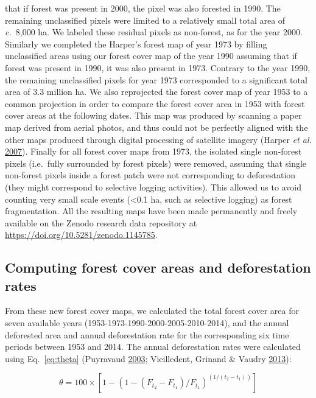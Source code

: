 \documentclass[]{article}
\theoremstyle{definition}
\theoremstyle{definition}
\theoremstyle{definition}
\theoremstyle{remark}
\begin{document}
that if forest was present in 2000, the pixel was also forested in 1990.
The remaining unclassified pixels were limited to a relatively small
total area of \emph{c.}~8,000 ha. We labeled these residual pixels as
non-forest, as for the year 2000. Similarly we completed the Harper's
forest map of year 1973 by filling unclassified areas using our forest
cover map of the year 1990 assuming that if forest was present in 1990,
it was also present in 1973. Contrary to the year 1990, the remaining
unclassified pixels for year 1973 corresponded to a significant total
area of 3.3 million ha. We also reprojected the forest cover map of year
1953 to a common projection in order to compare the forest cover area in
1953 with forest cover areas at the following dates. This map was
produced by scanning a paper map derived from aerial photos, and thus
could not be perfectly aligned with the other maps produced through
digital processing of satellite imagery (Harper \emph{et al.}
\protect\hyperlink{ref-Harper2007}{2007}). Finally for all forest cover
maps from 1973, the isolated single non-forest pixels (i.e.~fully
surrounded by forest pixels) were removed, assuming that single
non-forest pixels inside a forest patch were not corresponding to
deforestation (they might correspond to selective logging activities).
This allowed us to avoid counting very small scale events
(\textless{}0.1 ha, such as selective logging) as forest fragmentation.
All the resulting maps have been made permanently and freely available
on the Zenodo research data repository at
\url{https://doi.org/10.5281/zenodo.1145785}.

\hypertarget{computing-forest-cover-areas-and-deforestation-rates}{%
\subsection{Computing forest cover areas and deforestation
rates}\label{computing-forest-cover-areas-and-deforestation-rates}}

From these new forest cover maps, we calculated the total forest cover
area for seven available years (1953-1973-1990-2000-2005-2010-2014), and
the annual deforested area and annual deforestation rate for the
corresponding six time periods between 1953 and 2014. The annual
deforestation rates were calculated using Eq.~\eqref{eq:theta} (Puyravaud
\protect\hyperlink{ref-Puyravaud2003}{2003}; Vieilledent, Grinand \&
Vaudry \protect\hyperlink{ref-Vieilledent2013}{2013}):

\begin{equation}
  \label{eq:theta}
  \theta = 100 \times [1-(1-(F_{t_2}-F_{t_1})/F_{t_1})^{(1/(t_2-t_1))}]
\end{equation}
\end{document}
